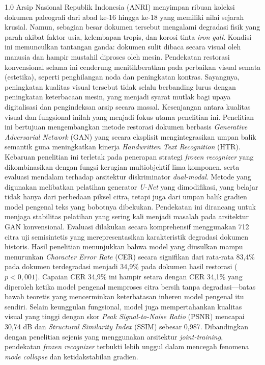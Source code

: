 \begin{spacing}{1.0}
    \noindent %
    Arsip Nasional Republik Indonesia (ANRI) menyimpan ribuan koleksi dokumen paleografi dari abad ke-16 hingga ke-18 yang memiliki nilai sejarah krusial. Namun, sebagian besar dokumen tersebut mengalami degradasi fisik yang parah akibat faktor usia, kelembapan tropis, dan korosi tinta \textit{iron gall}. Kondisi ini memunculkan tantangan ganda: dokumen sulit dibaca secara visual oleh manusia dan hampir mustahil diproses oleh mesin. Pendekatan restorasi konvensional selama ini cenderung menitikberatkan pada perbaikan visual semata (estetika), seperti penghilangan noda dan peningkatan kontras. Sayangnya, peningkatan kualitas visual tersebut tidak selalu berbanding lurus dengan peningkatan keterbacaan mesin, yang menjadi syarat mutlak bagi upaya digitalisasi dan pengindeksan arsip secara massal. Kesenjangan antara kualitas visual dan fungsional inilah yang menjadi fokus utama penelitian ini.
    Penelitian ini bertujuan mengembangkan metode restorasi dokumen berbasis \textit{Generative Adversarial Network} (GAN) yang secara eksplisit mengintegrasikan umpan balik semantik guna meningkatkan kinerja \textit{Handwritten Text Recognition} (HTR). Kebaruan penelitian ini terletak pada penerapan strategi \textit{frozen recognizer} yang dikombinasikan dengan fungsi kerugian multiobjektif lima komponen, serta evaluasi mendalam terhadap arsitektur diskriminator \textit{dual-modal}. Metode yang digunakan melibatkan pelatihan generator \textit{U-Net} yang dimodifikasi, yang belajar tidak hanya dari perbedaan piksel citra, tetapi juga dari umpan balik gradien model pengenal teks yang bobotnya dibekukan. Pendekatan ini dirancang untuk menjaga stabilitas pelatihan yang sering kali menjadi masalah pada arsitektur GAN konvensional.
    Evaluasi dilakukan secara komprehensif menggunakan 712 citra uji semisintetis yang merepresentasikan karakteristik degradasi dokumen historis. Hasil penelitian menunjukkan bahwa model yang diusulkan mampu menurunkan \textit{Character Error Rate} (CER) secara signifikan dari rata-rata 83,4\% pada dokumen terdegradasi menjadi 34,9\% pada dokumen hasil restorasi ($p<0{,}001$). Capaian CER 34,9\% ini hampir setara dengan CER 34,1\% yang diperoleh ketika model pengenal memproses citra bersih tanpa degradasi---batas bawah teoretis yang mencerminkan keterbatasan inheren model pengenal itu sendiri. Selain keunggulan fungsional, model juga mempertahankan kualitas visual yang tinggi dengan skor \textit{Peak Signal-to-Noise Ratio} (PSNR) mencapai 30,74 dB dan \textit{Structural Similarity Index} (SSIM) sebesar 0,987. Dibandingkan dengan penelitian sejenis yang menggunakan arsitektur \textit{joint-training}, pendekatan \textit{frozen recognizer} terbukti lebih unggul dalam mencegah fenomena \textit{mode collapse} dan ketidakstabilan gradien.

\end{spacing}
